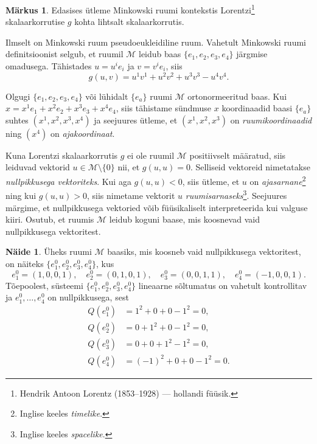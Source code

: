 \documentclass[12pt,a4paper,oneside]{article}
\theoremstyle{plain}
\theoremstyle{definition}
\newtheorem{naide}{Näide}[section]
\newtheorem{markus}{Märkus}[section]
\numberwithin{equation}{section}
\def\M{{\mathcal M}}
\begin{document}
\begin{markus}
Edasises ütleme Minkowski ruumi kontekstis Lorentzi\footnote{Hendrik Antoon Lorentz (1853--1928) --- hollandi füüsik.} skalaarkorrutise 
$g$ kohta lihtsalt skalaarkorrutis.
\end{markus}

Ilmselt on Minkowski ruum pseudoeukleidiline ruum. Vahetult Minkowski 
ruumi definitsioonist selgub, et ruumil $\M$ leidub baas 
$\{e_1, e_2, e_3, e_4\}$ järgmise omadusega. Tähistades 
$u = u^i e_i$ ja $v = v^i e_i$, siis
\[g\left(u, v\right) = u^1 v^1 + u^2 v^2 + u^3 v^3 - u^4 v^4.\]

Olgugi $\{e_1, e_2, e_3, e_4\}$ või lühidalt $\{e_a\}$ ruumi $\M$ 
ortonormeeritud baas. Kui $x = x^1 e_1 + x^2 e_2 + x^3 e_3 + x^4 e_4$, 
siis tähistame sündmuse $x$ koordinaadid baasi $\{e_a\}$ suhtes 
$\left( x^1, x^2, x^3, x^4 \right)$ ja seejuures ütleme, et 
$\left( x^1, x^2, x^3 \right)$ on \emph{ruumikoordinaadid} ning 
$\left(x^4\right)$ on \emph{ajakoordinaat}.

Kuna Lorentzi skalaarkorrutis $g$ ei ole ruumil $\M$ positiivselt 
määratud, siis leiduvad vektorid $u \in \M \setminus \{0\}$ nii, 
et $g \left(u, u\right) = 0$. Selliseid vektoreid nimetatakse 
\emph{nullpikkusega vektoriteks}. Kui aga $g \left(u, u\right) < 0$, 
siis ütleme, et $u$ on \emph{ajasarnane}\footnote{Inglise keeles 
\textit{timelike}.} ning kui $g \left(u, u\right) > 0$, siis nimetame 
vektorit $u$ \emph{ruumisarnaseks}\footnote{Inglise keeles 
\textit{spacelike}.}. Seejuures märgime, et nullpikkusega 
vektoried võib füüsikaliselt interpreteerida kui valguse kiiri.
Osutub, et ruumis $\M$ leidub koguni baase, mis koosnevad 
vaid nullpikkusega vektoritest.

\begin{naide}
Üheks ruumi $\M$ baasiks, mis koosneb vaid nullpikkusega vektoritest, 
on näiteks $\{e_1^0, e_2^0, e_3^0, e_4^0\}$, kus 
\[e_1^0 = \left(1, 0, 0, 1\right),\quad e_2^0 = \left(0, 1, 0, 1\right),\quad 
e_3^0 = \left(0, 0, 1, 1\right),\quad e_4^0 = 
\left(-1, 0, 0, 1\right).\]
Tõepoolest, süsteemi $\{e_1^0, e_2^0, e_3^0, e_4^0\}$ lineaarne 
sõltumatus on vahetult kontrollitav ja $e_1^0, \dots, e_4^0$ on 
nullpikkusega, sest
\begin{align*}
Q\left(e_1^0\right) &= 1^2 + 0 + 0 - 1^2 = 0, \\
Q\left(e_2^0\right) &= 0 + 1^2 + 0 - 1^2 = 0, \\
Q\left(e_3^0\right) &= 0 + 0 + 1^2 - 1^2 = 0, \\
Q\left(e_4^0\right) &= (-1)^2 + 0 + 0 - 1^2 = 0.
\end{align*}
\end{naide}
\end{document}

